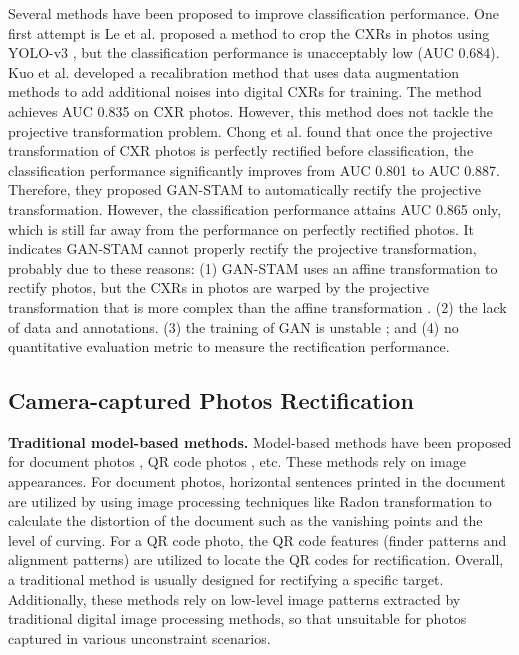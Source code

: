 \documentclass[preprint, 12pt]{elsarticle}
\begin{document}
Several methods have been proposed to improve classification performance. One first attempt is Le et al. \cite{le2020interpretation} proposed a method to crop the CXRs in photos using YOLO-v3 \cite{redmon2018yolov3}, but the classification performance is unacceptably low (AUC 0.684). Kuo et al. \cite{kuo2021recalibration} developed a recalibration method that uses data augmentation methods to add additional noises into digital CXRs for training. The method achieves AUC 0.835 on CXR photos. However, this method does not tackle the projective transformation problem. Chong et al. \cite{chong2021gan} found that once the projective transformation of CXR photos is perfectly rectified before classification, the classification performance significantly improves from AUC 0.801 to AUC 0.887. Therefore, they proposed GAN-STAM to automatically rectify the projective transformation. However, the classification performance attains AUC 0.865 only, which is still far away from the performance on perfectly rectified photos. It indicates GAN-STAM cannot properly rectify the projective transformation, probably due to these reasons: (1) GAN-STAM uses an affine transformation to rectify photos, but the CXRs in photos are warped by the projective transformation that is more complex than the affine transformation \cite{solomon2011fundamentals}. (2) the lack of data and annotations. (3) the training of GAN is unstable \cite{creswell2018generative,wang2017generative}; and (4) no quantitative evaluation metric to measure the rectification performance.

\subsection{Camera-captured Photos Rectification}

\textbf{Traditional model-based methods.}
Model-based methods have been proposed for document photos \cite{fang2011distortion,liang2008geometric,takezawa2017robust}, QR code photos \cite{chang2007general, tribak2017qr}, etc. These methods rely on image appearances. For document photos, horizontal sentences printed in the document are utilized by using image processing techniques like Radon transformation \cite{deans2007radon, takezawa2017robust} to calculate the distortion of the document such as the vanishing points and the level of curving. For a QR code photo, the QR code features (finder patterns and alignment patterns) are utilized to locate the QR codes for rectification. Overall, a traditional method is usually designed for rectifying a specific target. Additionally, these methods rely on low-level image patterns extracted by traditional digital image processing methods, so that unsuitable for photos captured in various unconstraint scenarios.
\end{document}

